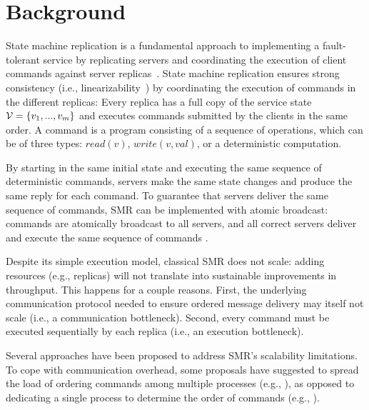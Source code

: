 \section{Background}


State machine replication is a fundamental approach to implementing a fault-tolerant service by replicating servers and coordinating the execution of client commands against server replicas~\cite{Lam78,Sch90}. 
State machine replication ensures strong consistency (i.e., linearizability~\cite{Attiya04}) by coordinating the execution of commands in the different replicas: Every replica has a full copy of the service state $\mathcal{V} = \{v_1, ..., v_m\}$ and executes commands submitted by the clients in the same order. A command is a program consisting of a sequence of operations, which can be of three types: $read(v)$, $write(v, val)$, or a deterministic computation.

By starting in the same initial state and executing the same sequence of deterministic commands, servers make the same state changes and produce the same reply for each command. To guarantee that servers deliver the same sequence of commands, SMR can be implemented with atomic broadcast: commands are atomically broadcast to all servers, and all correct servers deliver and execute the same sequence of commands \cite{BJ87b,DSU04}.

Despite its simple execution model, classical SMR does not scale: adding resources (e.g., replicas) will not translate into sustainable improvements in throughput. This happens for a couple reasons. First, the underlying communication protocol needed to ensure ordered message delivery may itself not scale (i.e., a communication bottleneck). Second, every command must be executed sequentially by each replica (i.e., an execution bottleneck).

Several approaches have been proposed to address SMR's scalability limitations. To cope with communication overhead, some proposals have suggested to spread the load of ordering commands among multiple processes (e.g., \cite{Moraru:2013gw,Mencius,Marandi:2012hb}), as opposed to dedicating a single process to determine the order of commands (e.g., \cite{Lamport:1998ea}).%

